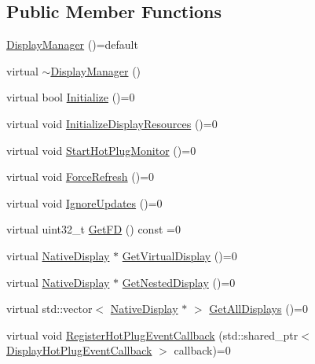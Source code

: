 \subsection*{Public Member Functions}
\begin{DoxyCompactItemize}
\item 
\mbox{\hyperlink{classhwcomposer_1_1DisplayManager_ae0d38f8308c54359c9de7e1c8e8f13c2}{Display\+Manager}} ()=default
\item 
virtual \mbox{\hyperlink{classhwcomposer_1_1DisplayManager_a34d71bf6f39f064b958920bbdc07c761}{$\sim$\+Display\+Manager}} ()
\item 
virtual bool \mbox{\hyperlink{classhwcomposer_1_1DisplayManager_abb67b1deed55bf20584f86aea2ae5167}{Initialize}} ()=0
\item 
virtual void \mbox{\hyperlink{classhwcomposer_1_1DisplayManager_a26b46eb7c0d15384fceaecdd8be9be45}{Initialize\+Display\+Resources}} ()=0
\item 
virtual void \mbox{\hyperlink{classhwcomposer_1_1DisplayManager_a9728735ff10a6e52861c4201bf8c6fb2}{Start\+Hot\+Plug\+Monitor}} ()=0
\item 
virtual void \mbox{\hyperlink{classhwcomposer_1_1DisplayManager_a678df886d9faff854111d8ace155befc}{Force\+Refresh}} ()=0
\item 
virtual void \mbox{\hyperlink{classhwcomposer_1_1DisplayManager_ac5d98f9c1c32dc2dbc3afb342a113af5}{Ignore\+Updates}} ()=0
\item 
virtual uint32\+\_\+t \mbox{\hyperlink{classhwcomposer_1_1DisplayManager_a7af00ef1c1c9dc8f3fd58699460ab14d}{Get\+FD}} () const =0
\item 
virtual \mbox{\hyperlink{classhwcomposer_1_1NativeDisplay}{Native\+Display}} $\ast$ \mbox{\hyperlink{classhwcomposer_1_1DisplayManager_a5fa2b92896cab774d8a85215dfac1d62}{Get\+Virtual\+Display}} ()=0
\item 
virtual \mbox{\hyperlink{classhwcomposer_1_1NativeDisplay}{Native\+Display}} $\ast$ \mbox{\hyperlink{classhwcomposer_1_1DisplayManager_ac05cc0db0d8191465746828b2027a6f7}{Get\+Nested\+Display}} ()=0
\item 
virtual std\+::vector$<$ \mbox{\hyperlink{classhwcomposer_1_1NativeDisplay}{Native\+Display}} $\ast$ $>$ \mbox{\hyperlink{classhwcomposer_1_1DisplayManager_aec3ebc4b4d22031e983856a424dd43a6}{Get\+All\+Displays}} ()=0
\item 
virtual void \mbox{\hyperlink{classhwcomposer_1_1DisplayManager_a2c1138176c411a5164052e83f623595d}{Register\+Hot\+Plug\+Event\+Callback}} (std\+::shared\+\_\+ptr$<$ \mbox{\hyperlink{classhwcomposer_1_1DisplayHotPlugEventCallback}{Display\+Hot\+Plug\+Event\+Callback}} $>$ callback)=0
\end{DoxyCompactItemize}
